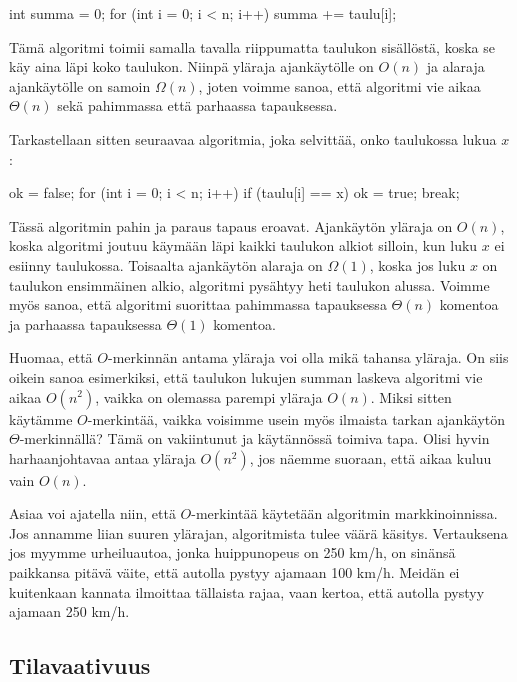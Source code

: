 \begin{code}
int summa = 0;
for (int i = 0; i < n; i++) {
    summa += taulu[i];
}
\end{code}

Tämä algoritmi toimii samalla tavalla riippumatta taulukon sisällöstä,
koska se käy aina läpi koko taulukon.
Niinpä yläraja ajankäytölle on $O(n)$ ja alaraja ajankäytölle on samoin $\Omega(n)$,
joten voimme sanoa, että algoritmi vie aikaa $\Theta(n)$ sekä pahimmassa
että parhaassa tapauksessa.

Tarkastellaan sitten seuraavaa algoritmia, joka selvittää,
onko taulukossa lukua $x$:

\begin{code}
ok = false;
for (int i = 0; i < n; i++) {
    if (taulu[i] == x) {
        ok = true;
        break;
    }
}
\end{code}

Tässä algoritmin pahin ja paraus tapaus eroavat.
Ajankäytön yläraja on $O(n)$, koska algoritmi joutuu käymään
läpi kaikki taulukon alkiot silloin, kun luku $x$
ei esiinny taulukossa.
Toisaalta ajankäytön alaraja on $\Omega(1)$,
koska jos luku $x$ on taulukon ensimmäinen alkio,
algoritmi pysähtyy heti taulukon alussa.
Voimme myös sanoa, että algoritmi suorittaa pahimmassa
tapauksessa $\Theta(n)$ komentoa ja parhaassa tapauksessa
$\Theta(1)$ komentoa.

Huomaa, että $O$-merkinnän antama yläraja voi olla mikä tahansa yläraja.
On siis oikein sanoa esimerkiksi, että taulukon lukujen summan
laskeva algoritmi vie aikaa $O(n^2)$, vaikka on olemassa parempi yläraja $O(n)$.
Miksi sitten käytämme $O$-merkintää, vaikka voisimme usein myös ilmaista tarkan
ajankäytön $\Theta$-merkinnällä?
Tämä on vakiintunut ja käytännössä toimiva tapa.
Olisi hyvin harhaanjohtavaa antaa yläraja $O(n^2)$,
jos näemme suoraan, että aikaa kuluu vain $O(n)$.

Asiaa voi ajatella niin, että $O$-merkintää käytetään algoritmin
markkinoinnissa. Jos annamme liian suuren ylärajan, algoritmista
tulee väärä käsitys.
Vertauksena jos myymme urheiluautoa, jonka huippunopeus on 250 km/h,
on sinänsä paikkansa pitävä väite, että autolla pystyy ajamaan 100 km/h.
Meidän ei kuitenkaan kannata ilmoittaa tällaista rajaa,
vaan kertoa, että autolla pystyy ajamaan 250 km/h.

\subsection{Tilavaativuus}


